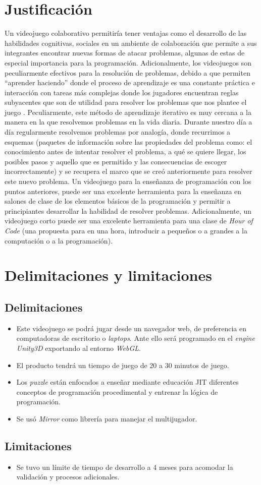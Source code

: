\section{Justificación}
Un videojuego colaborativo permitiría tener ventajas como el desarrollo de las habilidades cognitivas, sociales en un ambiente de colaboración que permite a sus integrantes encontrar nuevas formas de atacar problemas, algunas de estas de especial importancia para la programación. 
Adicionalmente, los videojuegos son peculiarmente efectivos para la resolución de problemas, debido a que permiten “aprender haciendo” donde el proceso de aprendizaje es una constante práctica e interacción con tareas más complejas donde los jugadores encuentran reglas subyacentes que son de utilidad para resolver los problemas que nos plantee el juego \cite{monjelat-a}. Peculiarmente, este método de aprendizaje iterativo es muy cercana a la manera en la que resolvemos problemas en la vida diaria. Durante nuestro día a día regularmente resolvemos problemas por analogía, donde recurrimos a esquemas (paquetes de información sobre las propiedades del problema como: el conocimiento antes de intentar resolver el problema, a qué se quiere llegar, los posibles pasos y aquello que es permitido y las consecuencias de escoger incorrectamente) y se recupera el marco que se creó anteriormente para resolver este nuevo problema.
Un videojuego para la enseñanza de programación con los puntos anteriores, puede ser una excelente herramienta para la enseñanza en salones de clase de los elementos básicos de la programación y permitir a principiantes desarrollar la habilidad de resolver problemas. Adicionalmente, un videojuego corto puede ser una excelente herramienta para una clase de \textit{Hour of Code} (una propuesta para en una hora, introducir a pequeños o a grandes a la computación o a la programación).


\section{Delimitaciones y limitaciones}
\subsection{Delimitaciones}
\begin{itemize}
    \item Este videojuego se podrá jugar desde un navegador web, de preferencia en computadoras de escritorio o \textit{laptops}. Ante ello será programado en el \textit{engine} \textit{Unity3D} exportando al entorno \textit{WebGL}.
    \item El producto tendrá un tiempo de juego de 20 a 30 minutos de juego.
    \item Los \textit{puzzle} están enfocados a enseñar mediante educación JIT diferentes conceptos de programación procedimental y entrenar la lógica de programación.
    \item Se usó \textit{Mirror} como librería para manejar el multijugador.
\end{itemize}
\subsection{Limitaciones}
\begin{itemize}
    \item Se tuvo un límite de tiempo de desarrollo a 4 meses para acomodar la validación y
procesos adicionales.

\end{itemize}
